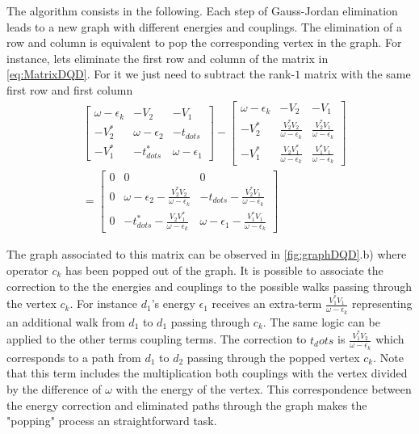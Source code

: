 The algorithm consists in the following. Each step of Gauss-Jordan elimination leads to a new graph with different energies and couplings. The elimination of a row and column is equivalent to pop the corresponding vertex in the graph. For instance, lets eliminate the first row and column of the matrix in \eqref{eq:MatrixDQD}. For it we just need to subtract the rank-$1$ matrix with the same first row and first column
\begin{align}
       & \left[\begin{array}{ccc}
    \omega-\epsilon_{k} & -V_{2} & -V_{1}\\
    -V_{2}^{*} & \omega-\epsilon_{2} & -t_{dots}\\
    -V_{1}^{*} & -t_{dots}^{*} & \omega-\epsilon_{1}
    \end{array}\right]-\left[\begin{array}{ccc}
    \omega-\epsilon_{k} & -V_{2} & -V_{1}\\
    -V_{2}^{*} & \frac{V_{2}^{*}V_{2}}{\omega-\epsilon_{k}} & \frac{V_{2}^{*}V_{1}}{\omega-\epsilon_{k}}\\
    -V_{1}^{*} & \frac{V_{2}V_{1}^{*}}{\omega-\epsilon_{k}} & \frac{V_{1}^{*}V_{1}}{\omega-\epsilon_{k}}
    \end{array}\right] \\ &= \left[\begin{array}{ccc}
    0 & 0 & 0\\
    0 & \omega-\epsilon_{2}-\frac{V_{2}^{*}V_{2}}{\omega-\epsilon_{k}} & -t_{dots}-\frac{V_{2}^{*}V_{1}}{\omega-\epsilon_{k}}\\
    0 & -t_{dots}^{*}-\frac{V_{2}V_{1}^{*}}{\omega-\epsilon_{k}} & \omega-\epsilon_{1}-\frac{V_{1}^{*}V_{1}}{\omega-\epsilon_{k}}
    \end{array}\right]
    \label{eq:Gauss-Jordan} 
\end{align}

The graph associated to this matrix can be observed in \ref{fig:graphDQD}.b) where operator $c_k$ has been popped out of the graph. It is possible to associate the correction to the the energies and couplings to the possible walks passing through the vertex $c_k$.  For instance $d_1$'s energy $\epsilon_1$ receives an extra-term $\frac{V_{1}^{*}V_{1}}{\omega-\epsilon_{k}}$ representing an additional walk  from $d_1$ to $d_1$ passing through  $c_k$. The same logic can be applied to the other terms coupling terms. The correction to $t_dots$ is $\frac{V_{1}^{*}V_{2}}{\omega-\epsilon_{k}}$ which corresponds to a path from $d_1$ to $d_2$ passing through the popped vertex $c_k$. Note that this term includes the multiplication both couplings with the vertex divided by the difference of $\omega$ with the energy of the vertex. This correspondence between the energy correction and eliminated paths through the graph makes the "popping" process an straightforward task. 

